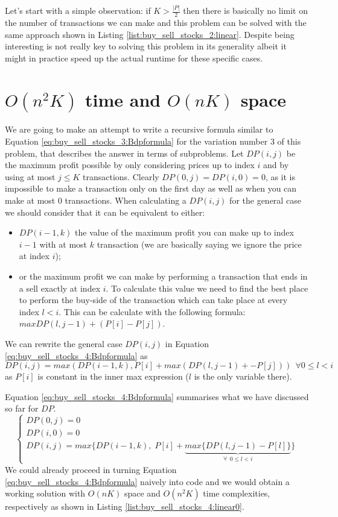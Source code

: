 Let's start with a simple observation: if $K > \frac{|P|}{2}$ then there is basically no limit on the number of transactions we can make and this problem can be solved with the same approach shown in Listing \ref{list:buy_sell_stocks_2:linear}.
Despite being interesting is not really key to solving this problem in its generality albeit it might in practice speed up the actual runtime for these specific cases.


\section{$O(n^2K)$ time and $O(nK)$ space}
\label{buy_sell_stocks4:sec:linerartime1}
We are going to make an attempt to write a recursive formula similar to Equation \ref{eq:buy_sell_stocks_3:Bdpformula} for the variation number $3$ of this problem, that describes the answer in terms of subproblems.
Let $DP(i,j)$ be the maximum profit possible by only considering prices up to index $i$ and by using at most $j \leq K$ transactions.
Clearly $DP(0,j)=DP(i,0)=0$, as it is impossible to make a transaction only on the first day as well as when you can make at most $0$ transactions.
When calculating a $DP(i,j)$ for the general case we should consider that it can be equivalent to either:
\begin{itemize}
    \item $DP(i-1,k)$ the value of the maximum profit you can make up to index $i-1$ with at most $k$ transaction (we are basically saying we ignore the price at index $i$);
    \item or the maximum profit we can make by performing a transaction that ends in a sell exactly at index $i$. To calculate this value we need to find the best place to perform the buy-side of the transaction which can take place at every index $l < i$. This can be calculate with the following formula: $max DP(l,j-1) + (P[i]-P[j])$.
\end{itemize}
We can rewrite the general case $DP(i,j)$ in Equation \ref{eq:buy_sell_stocks_4:Bdpformula} as 
$$DP(i,j) = max(DP(i-1,k), P[i] + max(DP(l,j-1)+-P[j])) \: \: \forall 0 \leq l < i$$ as $P[i]$ is constant in the inner max expression ($l$ is the only variable there).

Equation \ref{eq:buy_sell_stocks_4:Bdpformula} summarises what we have discussed so far for $DP$.
\begin{equation}
    \begin{cases}
        DP(0,j) = 0 \\
        DP(i,0) = 0 \\
        DP(i,j) = max\Big\{DP(i-1,k), \; P[i] + \underbrace{max\big\{DP(l,j-1)-P[l]\big\}}_{\forall \: \: 0 \leq l < i}\Big\}
     \end{cases}
    \label{eq:buy_sell_stocks_4:Bdpformula}
\end{equation}
We could already proceed in turning Equation \ref{eq:buy_sell_stocks_4:Bdpformula} naively into code and we would obtain a working solution with $O(nK)$ space and $O(n^2K)$ time complexities, respectively as shown in Listing \ref{list:buy_sell_stocks_4:linear0}.


